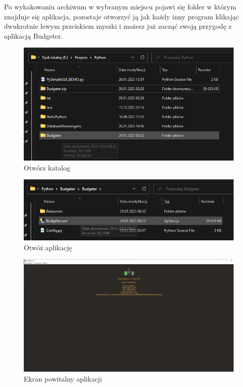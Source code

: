 \documentclass[a4paper,10pt, twoside]{report}
\begin{document}
{Po wykakowaniu archiwum w wybranym miejscu pojawi się folder w którym znajduje 
się aplikacja, pozostaje otworzyć ją jak każdy inny program klikając dwukrotnie 
lewym przciskiem myszki i możesz już zacząć swoją przygodę z aplikacją Budgeter.}

\begin{figure}[H]           %
    \caption{Otwórz katalog}
    \label{fig:Otwórz katalog}
    \centering
    \includegraphics[width=12cm]{figures/Guide/Budgeter_Instruction_02_open.png}
\end{figure}

\begin{figure}[H]           %
    \caption{Otwóż aplikację}
    \label{fig:Otwóż aplikację}
    \centering
    \includegraphics[width=12cm]{figures/Guide/Budgeter_Instruction_02_open_p2.png}
\end{figure}

\begin{figure}[H]           %
    \caption{Ekran powitalny aplikacji}
    \label{fig:Ekran powitalny aplikacji}
    \centering
    \includegraphics[width=12cm]{figures/Guide/Budgeter_Instruction_03_splashscreen.png}
\end{figure}
\end{document}
